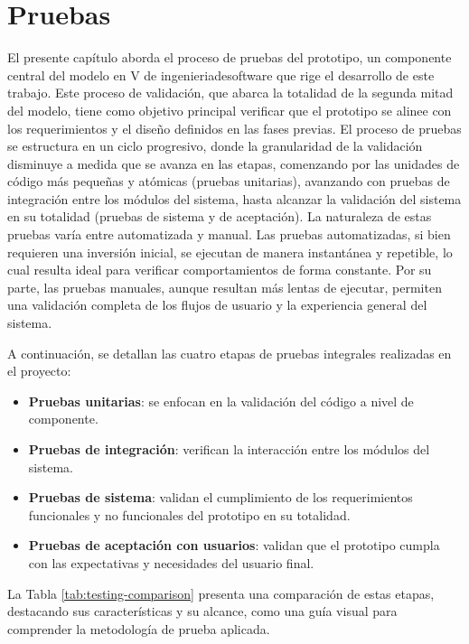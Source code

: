 \chapter[Pruebas]{Pruebas}
\label{cp:testing}

\parindent0pt

El presente capítulo aborda el proceso de pruebas del prototipo, un componente central del modelo en V de \gls{ingenieriadesoftware} que rige el desarrollo de este trabajo. Este proceso de validación, que abarca la totalidad de la segunda mitad del modelo, tiene como objetivo principal verificar que el prototipo se alinee con los requerimientos y el diseño definidos en las fases previas. El proceso de pruebas se estructura en un ciclo progresivo, donde la granularidad de la validación disminuye a medida que se avanza en las etapas, comenzando por las unidades de código más pequeñas y atómicas (pruebas unitarias), avanzando con pruebas de integración entre los módulos del sistema, hasta alcanzar la validación del sistema en su totalidad (pruebas de sistema y de aceptación). La naturaleza de estas pruebas varía entre automatizada y manual. Las pruebas automatizadas, si bien requieren una inversión inicial, se ejecutan de manera instantánea y repetible, lo cual resulta ideal para verificar comportamientos de forma constante. Por su parte, las pruebas manuales, aunque resultan más lentas de ejecutar, permiten una validación completa de los flujos de usuario y la experiencia general del sistema.

A continuación, se detallan las cuatro etapas de pruebas integrales realizadas en el proyecto:

\begin{itemize}
\item \textbf{Pruebas unitarias}: se enfocan en la validación del código a nivel de componente.
\item \textbf{Pruebas de integración}: verifican la interacción entre los módulos del sistema.
\item \textbf{Pruebas de sistema}: validan el cumplimiento de los requerimientos funcionales y no funcionales del prototipo en su totalidad.
\item \textbf{Pruebas de aceptación con usuarios}: validan que el prototipo cumpla con las expectativas y necesidades del usuario final.
\end{itemize}

La Tabla \ref{tab:testing-comparison} presenta una comparación de estas etapas, destacando sus características y su alcance, como una guía visual para comprender la metodología de prueba aplicada.

